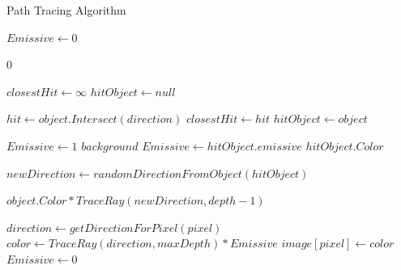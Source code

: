 \documentclass[12pt]{article}
\begin{document}
\begin{algorithm}[H]
    \caption{Path Tracing Algorithm}
    \label{alg:TraceRay}
    \small
    \begin{algorithmic}[1]
        \State $Emissive \gets 0$

        \State \Return $0$ 
        \EndIf

        \State $closestHit \gets \infty$
        \State $hitObject \gets null$

        \State $hit \gets object.Intersect(direction)$
        \State $closestHit \gets hit$
        \State $hitObject \gets object$
        \EndIf
        \EndFor

        \State $Emissive \gets 1$ 
        \State \Return $background$
        \EndIf
        \State $Emissive \gets hitObject.emissive$
         
        \State \Return $hitObject.Color$
        \EndIf

        \State $newDirection \gets randomDirectionFromObject(hitObject)$ 

        \State \Return $object.Color * TraceRay(newDirection, depth - 1)$

        \EndProcedure

        \State $direction \gets getDirectionForPixel(pixel)$
        \State $color \gets TraceRay(direction, maxDepth) * Emissive$
        \State $image[pixel] \gets color$
        \State $Emissive \gets 0$ 
        \EndFor
    \end{algorithmic}
\end{algorithm}
\end{document}
